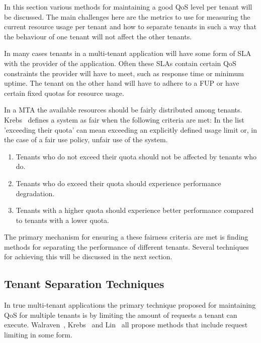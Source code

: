 In this section various methods for maintaining a good \ac{QoS} level per tenant will be discussed.
The main challenges here are the metrics to use for measuring the current resource usage per tenant and how to separate tenants in such a way that the behaviour of one tenant will not affect the other tenants.~\cite{krebs2013metrics}

In many cases tenants in a multi-tenant application will have some form of \ac{SLA} with the provider of the application.
Often these SLAs contain certain \ac{QoS} constraints the provider will have to meet, such as response time or minimum uptime. 
The tenant on the other hand will have to adhere to a \ac{FUP} or have certain fixed quotas for resource usage.

In a \ac{MTA} the available resources should be fairly distributed among tenants.
Krebs~\cite{krebs2013metrics} defines a system as fair when the following criteria are met:
In the list 'exceeding their quota' can mean exceeding an explicitly defined usage limit or, in the case of a fair use policy, unfair use of the system.
\begin{enumerate}
	\item Tenants who do not exceed their quota should not be affected by tenants who do.
	\item Tenants who do exceed their quota should experience performance degradation. 
	\item Tenants with a higher quota should experience better performance compared to tenants with a lower quota.
\end{enumerate}

The primary mechanism for ensuring a these fairness criteria are met is finding methods for separating the performance of different tenants.
Several techniques for achieving this will be discussed in the next section.


\subsection{Tenant Separation Techniques}
In true multi-tenant applications the primary technique proposed for maintaining \ac{QoS} for multiple tenants is by limiting the amount of requests a tenant can execute. Walraven~\cite{walraven2012towards}, Krebs~\cite{krebs2013metrics} and Lin~\cite{lin2009feedback} all propose methods that include request limiting in some form.

